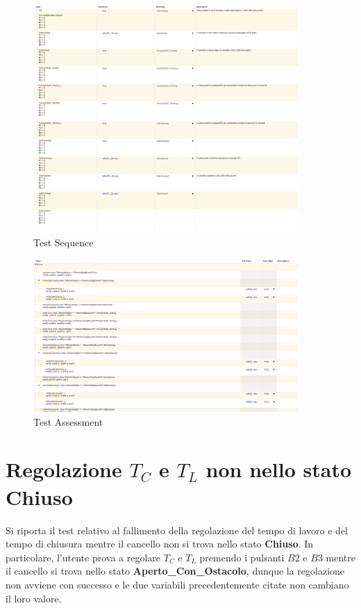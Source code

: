         \begin{figure}[H]
            \centering
            \includegraphics[width=0.9\textwidth]{figures/tuning_closing.png}
            \caption{Test Sequence}
            \label{tuningclos}
        \end{figure}

        \begin{figure}[H]
            \centering
            \includegraphics[width=0.9\textwidth]{figures/tuning_closing1.png}
            \caption{Test Assessment}
            \label{tuningclos1}
        \end{figure}


    \section{Regolazione $T_C$ e $T_L$ non nello stato Chiuso}
        Si riporta il test relativo al fallimento della regolazione del tempo di lavoro e del tempo di chiusura mentre il cancello non si trova nello stato \textbf{Chiuso}.
        In particolare, l'utente prova a regolare $T_C$ e $T_L$ premendo i pulsanti $B2$ e $B3$ mentre il cancello si trova nello stato \textbf{Aperto\_Con\_Ostacolo}, dunque la regolazione non avviene con successo e le due variabili precedentemente citate non cambiano il loro valore.

